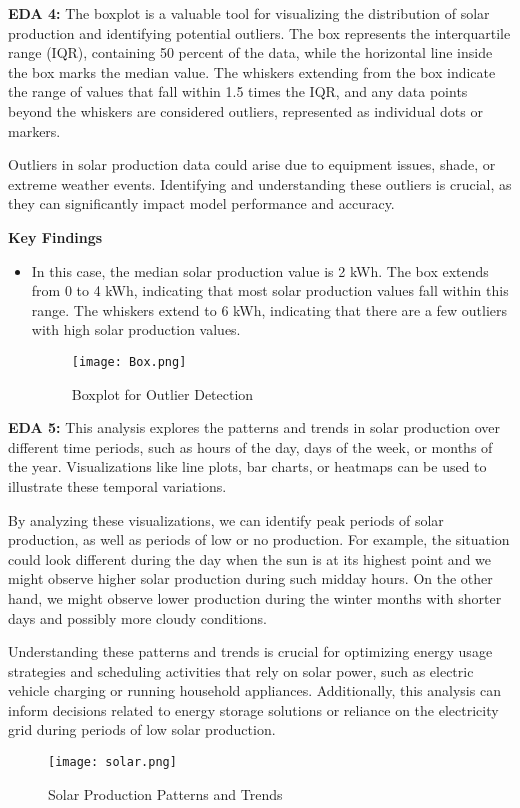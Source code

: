 \documentclass[conference]{IEEEtran}
\begin{document}
\textbf{EDA 4:} The boxplot is a valuable tool for visualizing the distribution of solar production and identifying potential outliers. The box represents the interquartile range (IQR), containing 50 percent of the data, while the horizontal line inside the box marks the median value. The whiskers extending from the box indicate the range of values that fall within 1.5 times the IQR, and any data points beyond the whiskers are considered outliers, represented as individual dots or markers.

Outliers in solar production data could arise due to equipment issues, shade, or extreme weather events. Identifying and understanding these outliers is crucial, as they can significantly impact model performance and accuracy.

\textbf{Key Findings}
\begin{itemize}
\item In this case, the median solar production value is 2 kWh. The box extends from 0 to 4 kWh, indicating that most solar production values fall within this range. The whiskers extend to 6 kWh, indicating that there are a few outliers with high solar production values.
\begin{figure}[H] %
    \centering
    \texttt{[image: Box.png]}
    \caption{Boxplot for Outlier Detection}
    \label{fig:technical_workflow}
\end{figure}
\end{itemize}

\textbf{EDA 5:} This analysis explores the patterns and trends in solar production over different time periods, such as hours of the day, days of the week, or months of the year. Visualizations like line plots, bar charts, or heatmaps can be used to illustrate these temporal variations.

By analyzing these visualizations, we can identify peak periods of solar production, as well as periods of low or no production. For example, the situation could look different during the day when the sun is at its highest point and we might observe higher solar production during such midday hours. On the other hand, we might observe lower production during the winter months with shorter days and possibly more cloudy conditions.

Understanding these patterns and trends is crucial for optimizing energy usage strategies and scheduling activities that rely on solar power, such as electric vehicle charging or running household appliances. Additionally, this analysis can inform decisions related to energy storage solutions or reliance on the electricity grid during periods of low solar production.
\begin{figure}[H] %
    \centering
    \texttt{[image: solar.png]}
    \caption{Solar Production Patterns and Trends}
    \label{fig:technical_workflow}
\end{figure}
\end{document}
